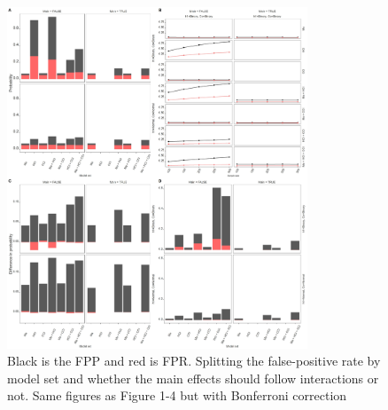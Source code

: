 \begin{figure}[t]
\includegraphics[width=0.8\textwidth]{R/Analysis/Result/Figures/Figure1BF.jpeg}
\centering
\caption{Black is the FPP and red is FPR.  Splitting the false-positive rate by model set and whether the main effects should follow interactions or not. Same figures as Figure 1-4 but with Bonferroni correction}
\label{fig:mainfigure}
\end{figure}

